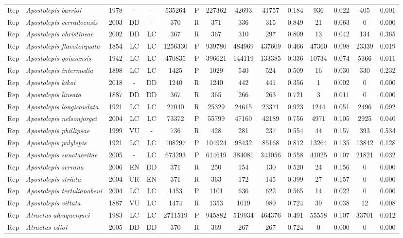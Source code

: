 \documentclass[12pt,openright,oneside,a4paper,english]{abntex2}
\begin{document}
\begin{landscape}
\begin{longtable}{llccccccccccccc}
		Rep&\textit{Apostolepis barrioi}&1978&-&-&535264&P&227362&42693&41757&0.184&936&0.022&405&0.001\\
		Rep&\textit{Apostolepis cerradoensis}&2003&DD&-&370&R&371&336&315&0.849&21&0.063&0&0.000\\
		Rep&\textit{Apostolepis christineae}&2002&DD&LC&367&R&367&310&297&0.809&13&0.042&134&0.365\\
		Rep&\textit{Apostolepis flavotorquata}&1854&LC&LC&1256330&P&939780&484969&437609&0.466&47360&0.098&23339&0.019\\
		Rep&\textit{Apostolepis goiasensis}&1942&LC&LC&470835&P&396621&144119&133385&0.336&10734&0.074&5366&0.011\\
		Rep&\textit{Apostolepis intermedia}&1898&LC&LC&1425&P&1029&540&524&0.509&16&0.030&330&0.232\\
		Rep&\textit{Apostolepis kikoi}&2018&-&DD&1240&R&1240&442&441&0.356&1&0.002&0&0.000\\
		Rep&\textit{Apostolepis lineata}&1887&DD&DD&367&R&365&266&263&0.721&3&0.011&0&0.000\\
		Rep&\textit{Apostolepis longicaudata}&1921&LC&LC&27040&R&25329&24615&23371&0.923&1244&0.051&2496&0.092\\
		Rep&\textit{Apostolepis nelsonjorgei}&2004&LC&LC&73372&P&55799&47160&42189&0.756&4971&0.105&2925&0.040\\
		Rep&\textit{Apostolepis phillipsae}&1999&VU&-&736&R&428&281&237&0.554&44&0.157&393&0.534\\
		Rep&\textit{Apostolepis polylepis}&1921&LC&LC&108297&P&104924&98432&85168&0.812&13264&0.135&13842&0.128\\
		Rep&\textit{Apostolepis sanctaeritae}&2005&-&LC&673293&P&614619&384081&343056&0.558&41025&0.107&21821&0.032\\
		Rep&\textit{Apostolepis serrana}&2006&EN&DD&371&R&250&154&130&0.520&24&0.156&0&0.000\\
		Rep&\textit{Apostolepis striata}&2004&CR&EN&371&R&363&172&145&0.399&27&0.157&0&0.000\\
		Rep&\textit{Apostolepis tertulianobeui}&2004&LC&LC&1453&P&1101&636&622&0.565&14&0.022&0&0.000\\
		Rep&\textit{Apostolepis vittata}&1887&VU&LC&1474&R&1353&1019&980&0.724&39&0.038&12&0.008\\
		Rep&\textit{Atractus albuquerquei}&1983&LC&LC&2711519&P&945882&519934&464376&0.491&55558&0.107&33701&0.012\\
		Rep&\textit{Atractus edioi}&2005&DD&DD&370&R&369&267&267&0.724&0&0.000&0&0.000\\

\end{longtable}
\end{landscape}
\end{document}
